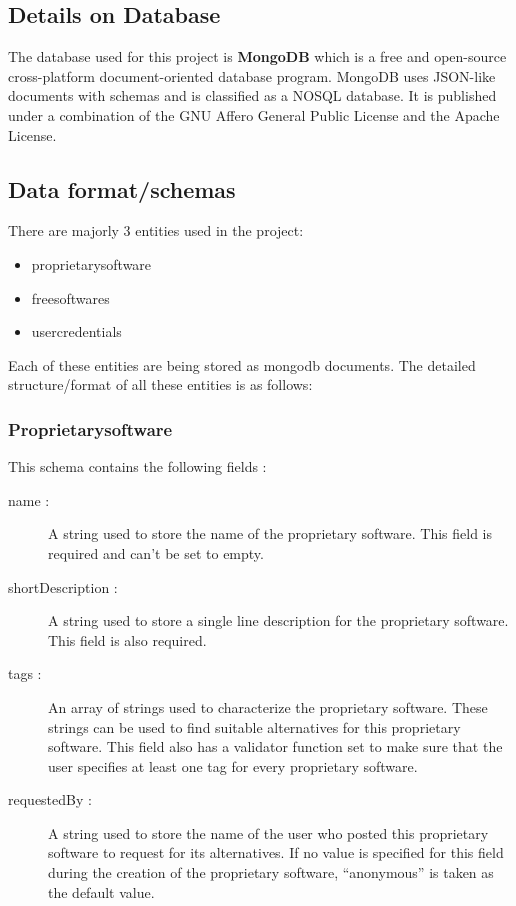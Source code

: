 \subsection{Details on Database}
The database used for this project is \textbf{MongoDB} which is a free and open-source cross-platform document-oriented database program. MongoDB uses JSON-like documents with schemas and is classified as a NOSQL database. It is published under a combination of the GNU Affero General Public License and the Apache License.

\subsection{Data format/schemas}
There are majorly 3 entities used in the project:
\begin{itemize}
\item proprietarysoftware
\item freesoftwares
\item usercredentials
\end{itemize}

Each of these entities are being stored as mongodb documents. The detailed structure/format of all these entities is as follows:


\subsubsection{Proprietarysoftware}
This schema contains the following fields :

\begin{description}
\item[name : ]
A string used to store the name of the proprietary software. This field is required and can’t be set to empty.

\item[shortDescription : ]
A string used to store a single line description for the proprietary software. This field is also required.

\item[tags : ]
An array of strings used to characterize the proprietary software. These strings can be used to find suitable alternatives for this proprietary software. This field also has a validator function set to make sure that the user specifies at least one tag for every proprietary software.

\item[requestedBy : ] 
A string used to store the name of the user who posted this proprietary software to request for its alternatives. If no value is specified for this field during the creation of the proprietary software, “anonymous” is taken as the default value.

\end{description}

